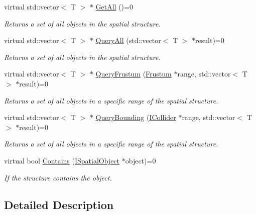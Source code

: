 \begin{DoxyCompactItemize}
virtual std\+::vector$<$ T $>$ $\ast$ \hyperlink{class_flounder_1_1_i_spatial_structure_a533a5190b622a2ee4e36d28a59d9b12f}{Get\+All} ()=0
\begin{DoxyCompactList}\small\item\em Returns a set of all objects in the spatial structure. \end{DoxyCompactList}\item 
virtual std\+::vector$<$ T $>$ $\ast$ \hyperlink{class_flounder_1_1_i_spatial_structure_a973595818e65dfaf31fb8eaf79d5b6fd}{Query\+All} (std\+::vector$<$ T $>$ $\ast$result)=0
\begin{DoxyCompactList}\small\item\em Returns a set of all objects in the spatial structure. \end{DoxyCompactList}\item 
virtual std\+::vector$<$ T $>$ $\ast$ \hyperlink{class_flounder_1_1_i_spatial_structure_a152be1fdfdc76866c1c18c4c2f72b09b}{Query\+Frustum} (\hyperlink{class_flounder_1_1_frustum}{Frustum} $\ast$range, std\+::vector$<$ T $>$ $\ast$result)=0
\begin{DoxyCompactList}\small\item\em Returns a set of all objects in a specific range of the spatial structure. \end{DoxyCompactList}\item 
virtual std\+::vector$<$ T $>$ $\ast$ \hyperlink{class_flounder_1_1_i_spatial_structure_a5059213aabb41bc892b9ec6bb6f996b2}{Query\+Bounding} (\hyperlink{class_flounder_1_1_i_collider}{I\+Collider} $\ast$range, std\+::vector$<$ T $>$ $\ast$result)=0
\begin{DoxyCompactList}\small\item\em Returns a set of all objects in a specific range of the spatial structure. \end{DoxyCompactList}\item 
virtual bool \hyperlink{class_flounder_1_1_i_spatial_structure_ae054d2ec399867ef48f33e693659f6cd}{Contains} (\hyperlink{class_flounder_1_1_i_spatial_object}{I\+Spatial\+Object} $\ast$object)=0
\begin{DoxyCompactList}\small\item\em If the structure contains the object. \end{DoxyCompactList}\end{DoxyCompactItemize}


\subsection{Detailed Description}
